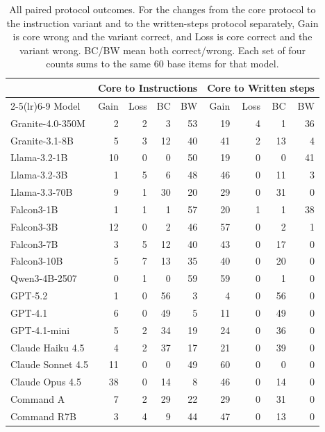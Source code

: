 \begin{table}[t]
\centering
\footnotesize
\setlength{\tabcolsep}{3pt}
\begin{tabular}{lrrrrrrrr}
\toprule
 & \multicolumn{4}{c}{Core to Instructions} & \multicolumn{4}{c}{Core to Written steps} \\
\cmidrule(lr){2-5}\cmidrule(lr){6-9}
Model & Gain & Loss & BC & BW & Gain & Loss & BC & BW \\
\midrule
Granite-4.0-350M & 2 & 2 & 3 & 53 & 19 & 4 & 1 & 36 \\
Granite-3.1-8B & 5 & 3 & 12 & 40 & 41 & 2 & 13 & 4 \\
Llama-3.2-1B & 10 & 0 & 0 & 50 & 19 & 0 & 0 & 41 \\
Llama-3.2-3B & 1 & 5 & 6 & 48 & 46 & 0 & 11 & 3 \\
Llama-3.3-70B & 9 & 1 & 30 & 20 & 29 & 0 & 31 & 0 \\
Falcon3-1B & 1 & 1 & 1 & 57 & 20 & 1 & 1 & 38 \\
Falcon3-3B & 12 & 0 & 2 & 46 & 57 & 0 & 2 & 1 \\
Falcon3-7B & 3 & 5 & 12 & 40 & 43 & 0 & 17 & 0 \\
Falcon3-10B & 5 & 7 & 13 & 35 & 40 & 0 & 20 & 0 \\
Qwen3-4B-2507 & 0 & 1 & 0 & 59 & 59 & 0 & 1 & 0 \\
GPT-5.2 & 1 & 0 & 56 & 3 & 4 & 0 & 56 & 0 \\
GPT-4.1 & 6 & 0 & 49 & 5 & 11 & 0 & 49 & 0 \\
GPT-4.1-mini & 5 & 2 & 34 & 19 & 24 & 0 & 36 & 0 \\
Claude Haiku 4.5 & 4 & 2 & 37 & 17 & 21 & 0 & 39 & 0 \\
Claude Sonnet 4.5 & 11 & 0 & 0 & 49 & 60 & 0 & 0 & 0 \\
Claude Opus 4.5 & 38 & 0 & 14 & 8 & 46 & 0 & 14 & 0 \\
Command A & 7 & 2 & 29 & 22 & 29 & 0 & 31 & 0 \\
Command R7B & 3 & 4 & 9 & 44 & 47 & 0 & 13 & 0 \\
\bottomrule
\end{tabular}
\caption{All paired protocol outcomes. For the changes from the core protocol to the instruction variant and to the written-steps protocol separately, Gain is core wrong and the variant correct, and Loss is core correct and the variant wrong. BC/BW mean both correct/wrong. Each set of four counts sums to the same 60 base items for that model.}
\label{tab:protocol-pairs}
\end{table}
